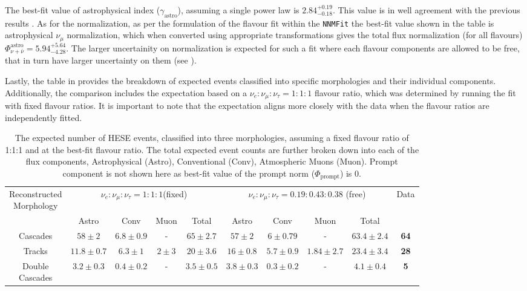 The best-fit value of astrophysical index ($\gamma_{\mathrm{astro}}$), assuming a single power law is $2.84_{-0.18}^{+0.19}$. This value is in well agreement with the previous results . As for the normalization, as per the formulation of the flavour fit within the \texttt{NNMFit} the best-fit value shown in the table is astrophysical $\nu_{\mu}$ normalization, which when converted using appropriate transformations gives the total flux normalization (for all flavours) $\Phi_{\nu+\bar\nu}^{\mathrm{astro}} = 5.94_{-4.28}^{+5.64}$. The larger uncertainity on normalization is expected for such a fit where each flavour components are allowed to be free, that in turn have larger uncertainty on them (see ). 

Lastly, the table in  provides the breakdown of expected events classified into specific morphologies and their individual components. Additionally, the comparison includes the expectation based on a $\nu_e:\nu_{\mu}:\nu_{\tau} = 1:1:1$ flavour ratio, which was determined by running the fit with fixed flavour ratios. It is important to note that the expectation aligns more closely with the data when the flavour ratios are independently fitted.

\begin{table}[h]
    \caption{The expected number of HESE events, classified into three morphologies, assuming a fixed flavour ratio of 1:1:1 and at the best-fit flavour ratio. The total expected event counts are further broken down into each of the flux components, Astrophysical (Astro), Conventional (Conv), Atmospheric Muons (Muon). Prompt component is not shown here as best-fit value of the prompt norm ($\Phi_{\mathrm{prompt}}$) is 0.}
    
    \begin{tabular}{ c| c c c c |c c c c|c}
        
        \hline
        \makecell{Reconstructed \\ Morphology} & \multicolumn{4}{c|}{$\nu_e:\nu_{\mu}:\nu_{\tau} = 1:1:1$(fixed)}  & \multicolumn{4}{c|}{$\nu_e:\nu_{\mu}:\nu_{\tau} = 0.19:0.43:0.38$ (free)} & Data\\
         &Astro&Conv&Muon&Total&Astro&Conv&Muon&Total& \\
        \hline
        \hline
        Cascades&$58\pm2$&$6.8\pm0.9$&-&\textbf{$65\pm2.7$}&$57\pm2$&$6\pm0.79$&-&\textbf{$63.4\pm2.4$}&\textbf{64}\\
        Tracks&$11.8\pm0.7$&$6.3\pm1$&$2\pm3$&\textbf{$20\pm3.6$}&$16\pm0.8$&$5.7\pm0.9$&$1.84\pm2.7$&\textbf{$23.4\pm3.4$}&\textbf{28}\\
        \makecell{Double \\ Cascades}&$3.2\pm0.3$&$0.4\pm0.2$&-&\textbf{$3.5\pm0.5$}&$3.8\pm0.3$&$0.3\pm0.2$&-&\textbf{$4.1\pm0.4$}&\textbf{5}\\
        \hline
        \hline
    \end{tabular}
    
\end{table}


